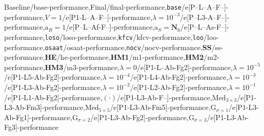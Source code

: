 Baseline/base-performance,Final/final-performance,\texttt{base}/e[P--L--A--F--]-performance,$V = 1$/e[P1-L--A--F--]-performance,$\lambda = {10}^{-3}$/e[P--L3-A--F--]-performance,$\mathrm{a}_{R} = 1$/e[P--L--Af-F--]-performance,$\mathrm{a}_{S} = \mathbf{N}_6$/e[P--L--As-F--]-performance,\texttt{loso}/loso-performance,\texttt{kfcv}/kfcv-performance,\texttt{loo}/loo-performance,\texttt{osaat}/osaat-performance,\texttt{nocv}/nocv-performance,\textbf{SS}/ss-performance,\textbf{HE}/he-performance,\textbf{HM1}/m1-performance,\textbf{HM2}/m2-performance,\textbf{HM3}/m3-performance,$\lambda = 0$/e[P1-L--Ab-Fg2]-performance,$\lambda = {10}^{-5}$/e[P1-L5-Ab-Fg2]-performance,$\lambda = {10}^{-4}$/e[P1-L4-Ab-Fg2]-performance,$\lambda = {10}^{-3}$/e[P1-L3-Ab-Fg2]-performance,$\lambda = {10}^{-2}$/e[P1-L2-Ab-Fg2]-performance,$\lambda = {10}^{-1}$/e[P1-L1-Ab-Fg2]-performance,$(\cdot)$/e[P1-L3-Ab-F--]-performance,$\mathrm{Med}_{3\times3}$/e[P1-L3-Ab-Fm3]-performance,$\mathrm{Med}_{5\times5}$/e[P1-L3-Ab-Fm5]-performance,$\mathrm{G}_{\sigma=1}$/e[P1-L3-Ab-Fg1]-performance,$\mathrm{G}_{\sigma=2}$/e[P1-L3-Ab-Fg2]-performance,$\mathrm{G}_{\sigma=3}$/e[P1-L3-Ab-Fg3]-performance